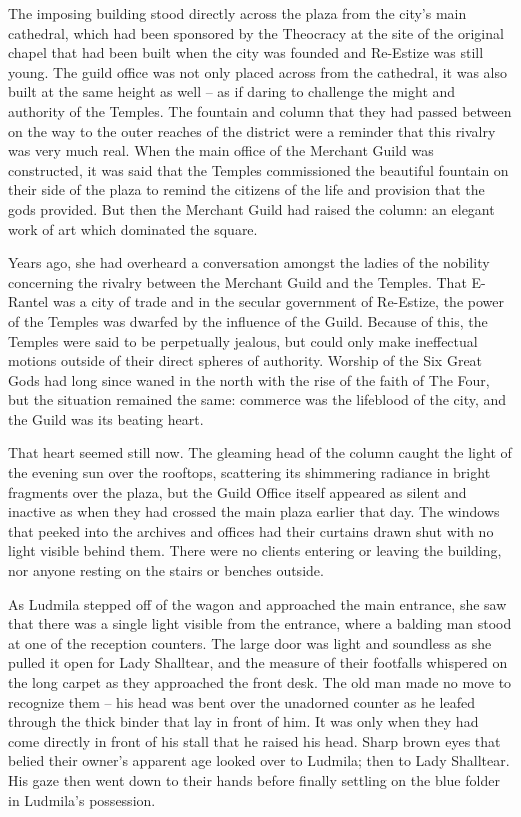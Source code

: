  

The imposing building stood directly across the plaza from the city’s main cathedral, which had been sponsored by the Theocracy at the site of the original chapel that had been built when the city was founded and Re-Estize was still young. The guild office was not only placed across from the cathedral, it was also built at the same height as well – as if daring to challenge the might and authority of the Temples. The fountain and column that they had passed between on the way to the outer reaches of the district were a reminder that this rivalry was very much real. When the main office of the Merchant Guild was constructed, it was said that the Temples commissioned the beautiful fountain on their side of the plaza to remind the citizens of the life and provision that the gods provided. But then the Merchant Guild had raised the column: an elegant work of art which dominated the square.

 

Years ago, she had overheard a conversation amongst the ladies of the nobility concerning the rivalry between the Merchant Guild and the Temples. That E-Rantel was a city of trade and in the secular government of Re-Estize, the power of the Temples was dwarfed by the influence of the Guild. Because of this, the Temples were said to be perpetually jealous, but could only make ineffectual motions outside of their direct spheres of authority. Worship of the Six Great Gods had long since waned in the north with the rise of the faith of The Four, but the situation remained the same: commerce was the lifeblood of the city, and the Guild was its beating heart.

 

That heart seemed still now. The gleaming head of the column caught the light of the evening sun over the rooftops, scattering its shimmering radiance in bright fragments over the plaza, but the Guild Office itself appeared as silent and inactive as when they had crossed the main plaza earlier that day. The windows that peeked into the archives and offices had their curtains drawn shut with no light visible behind them. There were no clients entering or leaving the building, nor anyone resting on the stairs or benches outside.

 

As Ludmila stepped off of the wagon and approached the main entrance, she saw that there was a single light visible from the entrance, where a balding man stood at one of the reception counters. The large door was light and soundless as she pulled it open for Lady Shalltear, and the measure of their footfalls whispered on the long carpet as they approached the front desk. The old man made no move to recognize them – his head was bent over the unadorned counter as he leafed through the thick binder that lay in front of him. It was only when they had come directly in front of his stall that he raised his head. Sharp brown eyes that belied their owner’s apparent age looked over to Ludmila; then to Lady Shalltear. His gaze then went down to their hands before finally settling on the blue folder in Ludmila’s possession.

